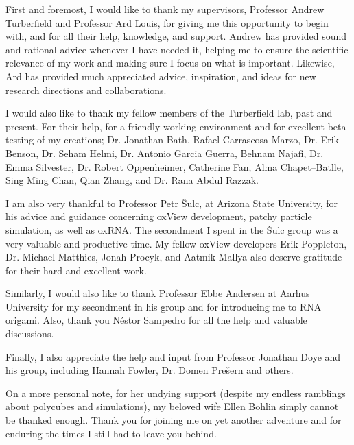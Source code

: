 

First and foremost, I would like to thank my supervisors, Professor Andrew Turberfield and Professor Ard Louis, for giving me this opportunity to begin with, and for all their help, knowledge, and support. Andrew has provided sound and rational advice whenever I have needed it, helping me to ensure the scientific relevance of my work and making sure I focus on what is important. Likewise, Ard has provided much appreciated advice, inspiration, and ideas for new research directions and collaborations.

I would also like to thank my fellow members of the Turberfield lab, past and present. For their help, for a friendly working environment and for excellent beta testing of my creations; Dr. Jonathan Bath, Rafael Carrascosa Marzo, Dr. Erik Benson, Dr. Seham Helmi, Dr. Antonio Garcia Guerra, Behnam Najafi, Dr. Emma Silvester, Dr. Robert Oppenheimer, Catherine Fan, Alma Chapet--Batlle, Sing Ming Chan, Qian Zhang, and Dr. Rana Abdul Razzak.

I am also very thankful to Professor Petr {\v{S}}ulc, at Arizona State University, for his advice and guidance concerning oxView development, patchy particle simulation, as well as oxRNA. The secondment I spent in the {\v{S}}ulc group was a very valuable and productive time. My fellow oxView developers Erik Poppleton, Dr. Michael Matthies, Jonah Procyk, and Aatmik Mallya also deserve gratitude for their hard and excellent work.

Similarly, I would also like to thank Professor Ebbe Andersen at Aarhus University for my secondment in his group and for introducing me to RNA origami. Also, thank you Néstor Sampedro for all the help and valuable discussions.

Finally, I also appreciate the help and input from Professor Jonathan Doye and his group, including Hannah Fowler, Dr. Domen Prešern and others.

On a more personal note, for her undying support (despite my endless ramblings about polycubes and simulations), my beloved wife Ellen Bohlin simply cannot be thanked enough. Thank you for joining me on yet another adventure and for enduring the times I still had to leave you behind. 

